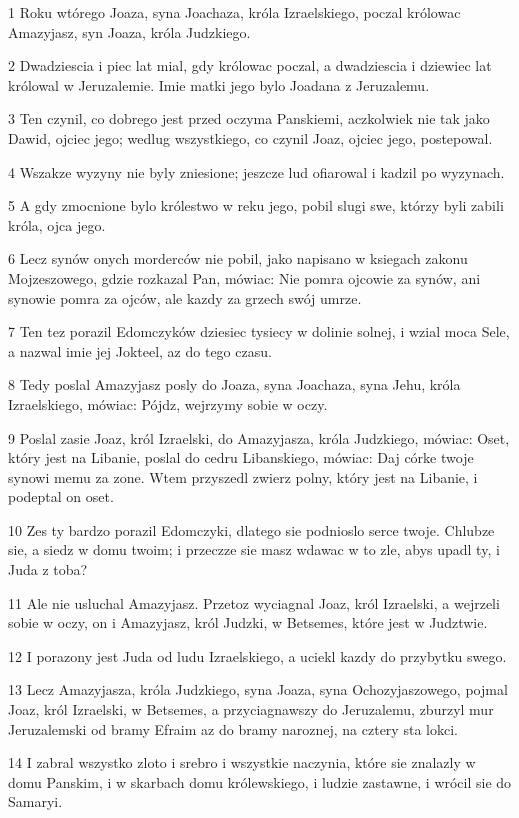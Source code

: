 \par 1 Roku wtórego Joaza, syna Joachaza, króla Izraelskiego, poczal królowac Amazyjasz, syn Joaza, króla Judzkiego.
\par 2 Dwadziescia i piec lat mial, gdy królowac poczal, a dwadziescia i dziewiec lat królowal w Jeruzalemie. Imie matki jego bylo Joadana z Jeruzalemu.
\par 3 Ten czynil, co dobrego jest przed oczyma Panskiemi, aczkolwiek nie tak jako Dawid, ojciec jego; wedlug wszystkiego, co czynil Joaz, ojciec jego, postepowal.
\par 4 Wszakze wyzyny nie byly zniesione; jeszcze lud ofiarowal i kadzil po wyzynach.
\par 5 A gdy zmocnione bylo królestwo w reku jego, pobil slugi swe, którzy byli zabili króla, ojca jego.
\par 6 Lecz synów onych morderców nie pobil, jako napisano w ksiegach zakonu Mojzeszowego, gdzie rozkazal Pan, mówiac: Nie pomra ojcowie za synów, ani synowie pomra za ojców, ale kazdy za grzech swój umrze.
\par 7 Ten tez porazil Edomczyków dziesiec tysiecy w dolinie solnej, i wzial moca Sele, a nazwal imie jej Jokteel, az do tego czasu.
\par 8 Tedy poslal Amazyjasz posly do Joaza, syna Joachaza, syna Jehu, króla Izraelskiego, mówiac: Pójdz, wejrzymy sobie w oczy.
\par 9 Poslal zasie Joaz, król Izraelski, do Amazyjasza, króla Judzkiego, mówiac: Oset, który jest na Libanie, poslal do cedru Libanskiego, mówiac: Daj córke twoje synowi memu za zone. Wtem przyszedl zwierz polny, który jest na Libanie, i podeptal on oset.
\par 10 Zes ty bardzo porazil Edomczyki, dlatego sie podnioslo serce twoje. Chlubze sie, a siedz w domu twoim; i przeczze sie masz wdawac w to zle, abys upadl ty, i Juda z toba?
\par 11 Ale nie usluchal Amazyjasz. Przetoz wyciagnal Joaz, król Izraelski, a wejrzeli sobie w oczy, on i Amazyjasz, król Judzki, w Betsemes, które jest w Judztwie.
\par 12 I porazony jest Juda od ludu Izraelskiego, a uciekl kazdy do przybytku swego.
\par 13 Lecz Amazyjasza, króla Judzkiego, syna Joaza, syna Ochozyjaszowego, pojmal Joaz, król Izraelski, w Betsemes, a przyciagnawszy do Jeruzalemu, zburzyl mur Jeruzalemski od bramy Efraim az do bramy naroznej, na cztery sta lokci.
\par 14 I zabral wszystko zloto i srebro i wszystkie naczynia, które sie znalazly w domu Panskim, i w skarbach domu królewskiego, i ludzie zastawne, i wrócil sie do Samaryi.
